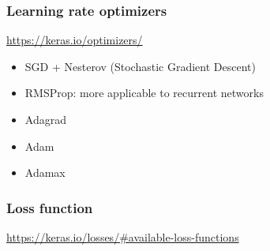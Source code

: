 \documentclass{article}
\begin{document}
\subsubsection{Learning rate optimizers}

\url{https://keras.io/optimizers/}

\begin{itemize}
    \item SGD + Nesterov (Stochastic Gradient Descent)
    \item RMSProp: more applicable to recurrent networks
    \item Adagrad
    \item Adam
    \item Adamax
\end{itemize}

\subsubsection{Loss function}

\url{https://keras.io/losses/#available-loss-functions}
\end{document}
